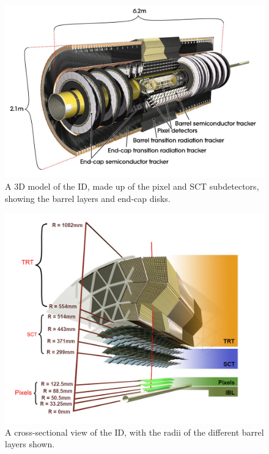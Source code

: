 \begin{figure}[!htpb]
  \centering
  \includegraphics[width=0.75\linewidth]{chapters/2.detector/figs/atlas_id.jpg}
  \caption{
    A 3D model of the \ATLAS ID, made up of the pixel and SCT subdetectors, showing the barrel layers and end-cap disks.
  }
  \label{fig:atlas_id_run1}
\end{figure}
%
\begin{figure}[!htpb]
  \centering
  \includegraphics[width=0.75\linewidth]{chapters/2.detector/figs/atlas_id_xs.png}
  \caption{A cross-sectional view of the \ATLAS ID, with the radii of the different barrel layers shown.}
  \label{fig:atlas_id_run2}
\end{figure}
%

